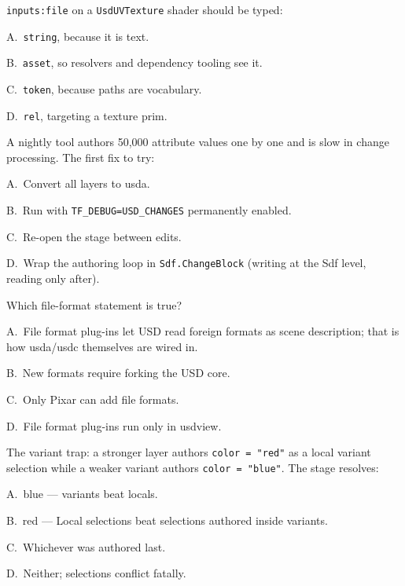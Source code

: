 \texttt{inputs:file} on a \texttt{UsdUVTexture} shader should be typed:
\begin{Choices}
  \item A.\ \texttt{string}, because it is text.
  \item B.\ \texttt{asset}, so resolvers and dependency tooling see it.
  \item C.\ \texttt{token}, because paths are vocabulary.
  \item D.\ \texttt{rel}, targeting a texture prim.
\end{Choices}

A nightly tool authors 50{,}000 attribute values one by one and is slow in
change processing. The first fix to try:
\begin{Choices}
  \item A.\ Convert all layers to usda.
  \item B.\ Run with \texttt{TF\_DEBUG=USD\_CHANGES} permanently enabled.
  \item C.\ Re-open the stage between edits.
  \item D.\ Wrap the authoring loop in \texttt{Sdf.ChangeBlock} (writing at the Sdf level, reading only after).
\end{Choices}

Which file-format statement is true?
\begin{Choices}
  \item A.\ File format plug-ins let USD read foreign formats as scene description; that is how usda/usdc themselves are wired in.
  \item B.\ New formats require forking the USD core.
  \item C.\ Only Pixar can add file formats.
  \item D.\ File format plug-ins run only in usdview.
\end{Choices}

The variant trap: a stronger layer authors \texttt{color = "red"} as a local
variant selection while a weaker variant authors \texttt{color = "blue"}.
The stage resolves:
\begin{Choices}
  \item A.\ blue --- variants beat locals.
  \item B.\ red --- Local selections beat selections authored inside variants.
  \item C.\ Whichever was authored last.
  \item D.\ Neither; selections conflict fatally.
\end{Choices}

